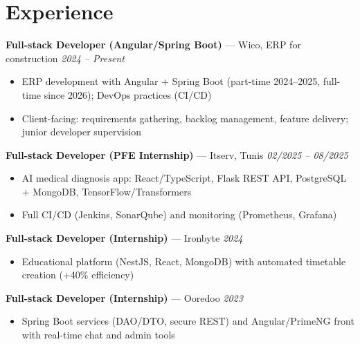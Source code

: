 \documentclass[10pt,a4paper]{article}
\begin{document}
\section*{Experience}
{\small

\textbf{Full-stack Developer (Angular/Spring Boot)} --- Wico, ERP for construction \hfill {\color{gray}\textit{2024 -- Present}}
\begin{itemize}[leftmargin=12pt,itemsep=0pt,topsep=1pt,parsep=0pt]
  \item ERP development with Angular + Spring Boot (part-time 2024--2025, full-time since 2026); DevOps practices (CI/CD)
  \item Client-facing: requirements gathering, backlog management, feature delivery; junior developer supervision
\end{itemize}

\vspace{2pt}
\textbf{Full-stack Developer (PFE Internship)} --- Itserv, Tunis \hfill {\color{gray}\textit{02/2025 -- 08/2025}}
\begin{itemize}[leftmargin=12pt,itemsep=0pt,topsep=1pt,parsep=0pt]
  \item AI medical diagnosis app: React/TypeScript, Flask REST API, PostgreSQL + MongoDB, TensorFlow/Transformers
  \item Full CI/CD (Jenkins, SonarQube) and monitoring (Prometheus, Grafana)
\end{itemize}

\vspace{2pt}
\textbf{Full-stack Developer (Internship)} --- Ironbyte \hfill {\color{gray}\textit{2024}}
\begin{itemize}[leftmargin=12pt,itemsep=0pt,topsep=1pt,parsep=0pt]
  \item Educational platform (NestJS, React, MongoDB) with automated timetable creation (+40\% efficiency)
\end{itemize}

\vspace{2pt}
\textbf{Full-stack Developer (Internship)} --- Ooredoo \hfill {\color{gray}\textit{2023}}
\begin{itemize}[leftmargin=12pt,itemsep=0pt,topsep=1pt,parsep=0pt]
  \item Spring Boot services (DAO/DTO, secure REST) and Angular/PrimeNG front with real-time chat and admin tools
\end{itemize}

}

\end{document}
